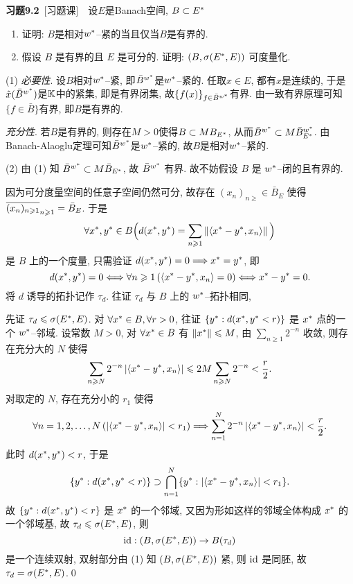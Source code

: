 	\textbf{习题9.2}\ [习题课]\ \ 设$ E $是Banach空间, $ B\subset\Star{E} $
	\begin{enumerate}[(1)]
		\item 证明: $ B $是相对$ \Star{w} $--紧的当且仅当$ B $是有界的.
		\item 假设 $ B $ 是有界的且 $ E $ 是可分的. 证明: $ (B, \sigma(\Star{E}, E)) $ 可度量化.
	\end{enumerate}
	\begin{Proof}
	(1) \textsl{必要性}. 设$ B $相对$ \Star{w} $--紧, 即$ \bar{B}^{\Star{w}} $是$ \Star{w} $--紧的. 任取$ x\in E $, 都有$ \hat{x} $是连续的, 于是$ \hat{x}(\bar{B}^{\Star{w}}) $是$ \K $中的紧集, 即是有界闭集, 故$ \{ f(x) \}_{f\in \bar{B}^{\Star{w}}} $有界. 由一致有界原理可知$ \{ f\in\bar{B} \} $有界, 即$ B $是有界的.
	
	\textsl{充分性}. 若$ B $是有界的, 则存在$ M>0 $使得$ B\subset MB_{\Star{E}} $, 从而$ \bar{B}^{\Star{w}}\subset M\bar{B}_{\Star{E}}^{\Star{w}} $. 由Banach-Alaoglu定理可知$ \bar{B}^{\Star{w}} $是$ \Star{w} $--紧的, 故$ B $是相对$ \Star{w} $--紧的.

	(2) 由 (1) 知 $ \bar{B}^{\Star{w}}\subset M\bar{B}_{\Star{E}} $, 故 $ \bar{B}^{\Star{w}}  $ 有界. 故不妨假设 $ B $ 是 $ \Star{w} $--闭的且有界的.

	因为可分度量空间的任意子空间仍然可分, 故存在 $ (x_{n})_{n\geqslant}\in\bar{B}_{E} $ 使得 $ \baro{(x_{n})_{n\geqslant1}}_{n\geqslant1}=\bar{B}_{E} $. 于是
	\[
		\forall \Star{x}, \Star{y}\in B\Big(d(\Star{x}, \Star{y})=\sum_{n\geqslant1}\norm{\lrangle{\Star{x}-\Star{y}, x_{n}}}\Big)
	\]
	是 $ B $ 上的一个度量, 只需验证 $ d(\Star{x}, \Star{y})=0\Longrightarrow \Star{x}=\Star{y} $, 即
	\[
		d(\Star{x}, \Star{y})=0\Longleftrightarrow \forall n\geqslant1\,(\lrangle{\Star{x}-\Star{y}, x_{n}}=0)\Longleftrightarrow \Star{x}-\Star{y}=0.
	\]
	将 $ d $ 诱导的拓扑记作 $ \tau_{d} $. 往证 $ \tau_{d} $ 与 $ B $ 上的 $ \Star{w} $--拓扑相同, 

	先证 $ \tau_{d}\leqslant\sigma(\Star{E}, E) $. 对 $ \forall\Star{x}\in B, \forall r>0 $, 往证 $ \{ \Star{y}: d(\Star{x}, \Star{y}<r) \} $ 是 $ \Star{x} $ 点的一个 $ \Star{w} $--邻域. 设常数 $ M>0 $, 对 $ \forall \Star{x}\in B $ 有 $ \norm{\Star{x}}\leqslant M $, 由 $ \sum\limits_{n\geqslant1}2^{-n} $ 收敛, 则存在充分大的 $ N $ 使得
	\[
		\sum_{n\geqslant N}2^{-n}\abs{\lrangle{\Star{x}-\Star{y}, x_{n}}}\leqslant 2M\sum_{n\geqslant N}2^{-n}<\frac{r}{2}.
	\]
	对取定的 $ N $, 存在充分小的 $ r_{1} $ 使得
	\[
		\forall n=1, 2, \dots, N\,(\abs{\lrangle{\Star{x}-\Star{y}, x_{n}}}<r_{1})\Longrightarrow \sum_{n=1}^{N} 2^{-n}\abs{\lrangle{\Star{x}-\Star{y}, x_{n}}}<\frac{r}{2}.
	\]
	此时 $ d(\Star{x}, \Star{y})<r $, 于是
	\[
		\{ \Star{y}:d(\Star{x}, \Star{y}<r) \}\supset \bigcap_{n=1}^{N}\{ \Star{y}:\abs{\lrangle{\Star{x}-\Star{y}, x_{n}}}<r_{1} \}.
	\]
	故 $ \{ \Star{y}: d(\Star{x}, \Star{y})<r \} $ 是 $ \Star{x} $ 的一个邻域, 又因为形如这样的邻域全体构成 $ \Star{x} $ 的一个邻域基, 故 $ \tau_{d}\leqslant\sigma(\Star{E}, E) $, 则
	\[
		\id: (B, \sigma(\Star{E}, E))\to B(\tau_{d})
	\]
	是一个连续双射, 双射部分由 (1) 知 $ (B, \sigma(\Star{E}, E)) $ 紧, 则 $ \id $ 是同胚, 故 $ \tau_{d}=\sigma(\Star{E}, E) $.\qed
	\end{Proof}
	
